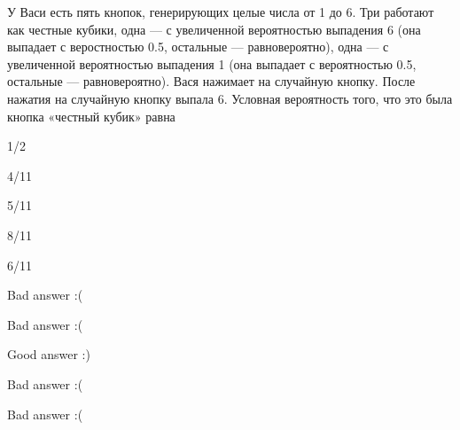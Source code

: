 
\begin{question}
У Васи есть пять кнопок, генерирующих целые числа от 1 до 6. Три
работают как честные кубики, одна — с увеличенной вероятностью
выпадения 6 (она выпадает с веростностью 0.5, остальные ---
равновероятно), одна — с увеличенной вероятностью выпадения 1 (она
выпадает с вероятностью 0.5, остальные — равновероятно). Вася нажимает
на случайную кнопку. После нажатия на случайную кнопку выпала 6.
Условная вероятность того, что это была кнопка «честный кубик» равна
\begin{answerlist}
  \item 1/2
  \item 4/11
  \item 5/11
  \item 8/11
  \item 6/11
\end{answerlist}
\end{question}

\begin{solution}
\begin{answerlist}
  \item Bad answer :(
  \item Bad answer :(
  \item Good answer :)
  \item Bad answer :(
  \item Bad answer :(
\end{answerlist}
\end{solution}

